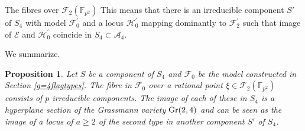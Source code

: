 \documentclass[11pt]{amsart}
\numberwithin{equation}{section}
\newcommand{\FF}{\mathbb F}
\newtheorem{proposition}[theorem]{Proposition}
\theoremstyle{definition}
\theoremstyle{remark}
\begin{document}
\begin{section}{The fibres over $\mathcal{F}_2({\FF}_{p^2})$}
This means that there is an irreducible component $S'$ of $S_4$
with model $\mathcal{F}_0^{\prime}$ 
and a locus $\mathcal{H}_0^{\prime}$ 
mapping dominantly to $\mathcal{F}_2^{\prime}$ such that image of $\mathcal{E}$
and $\mathcal{H}_0^{\prime}$ coincide in $S_4 \subset \mathcal{A}_4$. 

We summarize.

\begin{proposition} Let $S$ be a component of $S_4$ and $\mathcal{F}_0$ be the
model constructed in Section \ref{g=4flagtypes}.
The fibre in $\mathcal{F}_0$ over a rational point $\xi \in \mathcal{F}_2({\FF}_{p^2})$
consists of $p$ irreducible components. The image of each of these in $S_4$ is a hyperplane
section of the Grassmann variety ${\rm Gr}(2,4)$ and can be seen as the image of 
a locus of $a\geq 2$ of the second type in another component $S'$ of $S_4$.
\end{proposition}
\end{section}
\end{document}
